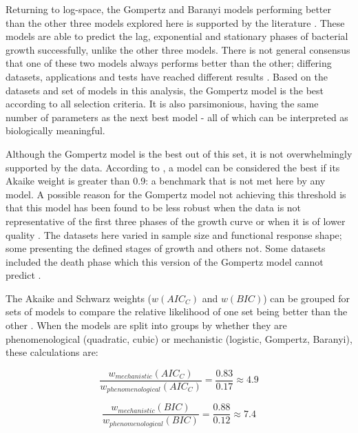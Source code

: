 \documentclass[11pt]{article}
\begin{document}
\begin{linenumbers}
        Returning to log-space, the Gompertz and Baranyi models performing better than the other three models explored here is supported by the literature \citep{zwietering_modeling_1990, mckellar_primary_2003, lopez_statistical_2004}. These models are able to predict the lag, exponential and stationary phases of bacterial growth successfully, unlike the other three models. There is not general consensus that one of these two models always performs better than the other; differing datasets, applications and tests have reached different results \citep[e.g.][]{zwietering_modeling_1990, baranyi_non-autonomous_1993, buchanan_when_1997, lopez_statistical_2004, oksuz_monte_2020}. Based on the datasets and set of models in this analysis, the Gompertz model is the best according to all selection criteria. It is also parsimonious, having the same number of parameters as the next best model - all of which can be interpreted as biologically meaningful. 

        Although the Gompertz model is the best out of this set, it is not overwhelmingly supported by the data. According to \cite{johnson_model_2004}, a model can be considered the best if its Akaike weight is greater than 0.9: a benchmark that is not met here by any model. A possible reason for the Gompertz model not achieving this threshold is that this model has been found to be less robust when the data is not representative of the first three phases of the growth curve or when it is of lower quality \citep{mckellar_primary_2003, baty_estimating_2004}. The datasets here varied in sample size and functional response shape; some presenting the defined stages of growth and others not. Some datasets included the death phase which this version of the Gompertz model cannot predict \citep{chatterjee_antibacterial_2015, salazar_primary_2021}.


        The Akaike and Schwarz weights ($w(AIC_C)$ and $w(BIC)$) can be grouped for sets of models to compare the relative likelihood of one set being better than the other \citep{wagenmakers_aic_2004}. When the models are split into groups by whether they are phenomenological (quadratic, cubic) or mechanistic (logistic, Gompertz, Baranyi), these calculations are:
        
        \begin{equation}
            \frac{w_{mechanistic}(AIC_C)}{w_{phenomenological}(AIC_C)} = \frac{0.83}{0.17} \approx 4.9 
        \end{equation}
        
        \begin{equation}
            \frac{w_{mechanistic}(BIC)}{w_{phenomenological}(BIC)} = \frac{0.88}{0.12} \approx 7.4
        \end{equation}
        

\end{linenumbers}
\end{document}
